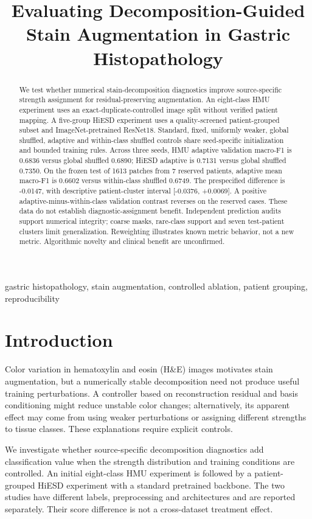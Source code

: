 \documentclass[conference]{IEEEtran}
\title{Evaluating Decomposition-Guided Stain Augmentation in Gastric Histopathology}
\author{\IEEEauthorblockN{Amlan Choudhury}\IEEEauthorblockA{School of Computer Science and Engineering\\KIIT Deemed to be University}}
\begin{document}
\maketitle
\begin{abstract}
We test whether numerical stain-decomposition diagnostics improve source-specific strength assignment for residual-preserving augmentation. An eight-class HMU experiment uses an exact-duplicate-controlled image split without verified patient mapping. A five-group HiESD experiment uses a quality-screened patient-grouped subset and ImageNet-pretrained ResNet18. Standard, fixed, uniformly weaker, global shuffled, adaptive and within-class shuffled controls share seed-specific initialization and bounded training rules. Across three seeds, HMU adaptive validation macro-F1 is 0.6836 versus global shuffled 0.6890; HiESD adaptive is 0.7131 versus global shuffled 0.7350. On the frozen test of 1613 patches from 7 reserved patients, adaptive mean macro-F1 is 0.6602 versus within-class shuffled 0.6749. The prespecified difference is -0.0147, with descriptive patient-cluster interval [-0.0376, +0.0069]. A positive adaptive-minus-within-class validation contrast reverses on the reserved cases. These data do not establish diagnostic-assignment benefit. Independent prediction audits support numerical integrity; coarse masks, rare-class support and seven test-patient clusters limit generalization. Reweighting illustrates known metric behavior, not a new metric. Algorithmic novelty and clinical benefit are unconfirmed.
\end{abstract}
\begin{IEEEkeywords}gastric histopathology, stain augmentation, controlled ablation, patient grouping, reproducibility\end{IEEEkeywords}
\section{Introduction}
Color variation in hematoxylin and eosin (H\&E) images motivates stain augmentation, but a numerically stable decomposition need not produce useful training perturbations. A controller based on reconstruction residual and basis conditioning might reduce unstable color changes; alternatively, its apparent effect may come from using weaker perturbations or assigning different strengths to tissue classes. These explanations require explicit controls.

We investigate whether source-specific decomposition diagnostics add classification value when the strength distribution and training conditions are controlled. An initial eight-class HMU experiment is followed by a patient-grouped HiESD experiment with a standard pretrained backbone. The two studies have different labels, preprocessing and architectures and are reported separately. Their score difference is not a cross-dataset treatment effect.
\end{document}
